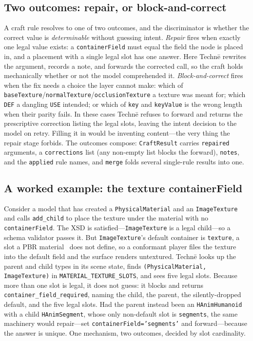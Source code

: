 \documentclass[sigconf,nonacm,screen,anonymous]{acmart}
\begin{document}
\subsection{Two outcomes: repair, or block-and-correct}
A craft rule resolves to one of two outcomes, and the discriminator is whether the correct value is \emph{determinable} without guessing intent. \emph{Repair} fires when exactly one legal value exists: a \texttt{containerField} must equal the field the node is placed in, and a placement with a single legal slot has one answer. Here Technē rewrites the argument, records a note, and forwards the corrected call, so the craft holds mechanically whether or not the model comprehended it. \emph{Block-and-correct} fires when the fix needs a choice the layer cannot make: which of \texttt{baseTexture}/\texttt{normalTexture}/\texttt{occlusionTexture} a texture was meant for; which \texttt{DEF} a dangling \texttt{USE} intended; or which of \texttt{key} and \texttt{keyValue} is the wrong length when their parity fails. In these cases Technē refuses to forward and returns the prescriptive correction listing the legal slots, leaving the intent decision to the model on retry. Filling it in would be inventing content---the very thing the repair stage forbids. The outcomes compose: \texttt{CraftResult} carries \texttt{repaired} arguments, a \texttt{corrections} list (any non-empty list blocks the forward), \texttt{notes}, and the \texttt{applied} rule names, and \texttt{merge} folds several single-rule results into one.

\subsection{A worked example: the texture containerField}
Consider a model that has created a \texttt{PhysicalMaterial} and an \texttt{ImageTexture} and calls \texttt{add\_child} to place the texture under the material with no \texttt{containerField}. The XSD is satisfied---\texttt{ImageTexture} is a legal child---so a schema validator passes it. But \texttt{ImageTexture}'s default container is \texttt{texture}, a slot a PBR material~\cite{gltf} does not define, so a conformant player files the texture into the default field and the surface renders untextured. Technē looks up the parent and child types in its scene state, finds \texttt{(PhysicalMaterial, ImageTexture)} in \texttt{MATERIAL\_TEXTURE\_SLOTS}, and sees five legal slots. Because more than one slot is legal, it does not guess: it blocks and returns \texttt{container\_field\_required}, naming the child, the parent, the silently-dropped default, and the five legal slots. Had the parent instead been an \texttt{HAnimHumanoid}~\cite{hanim} with a child \texttt{HAnimSegment}, whose only non-default slot is \texttt{segments}, the same machinery would repair---set \texttt{containerField='segments'} and forward---because the answer is unique. One mechanism, two outcomes, decided by slot cardinality.
\end{document}
